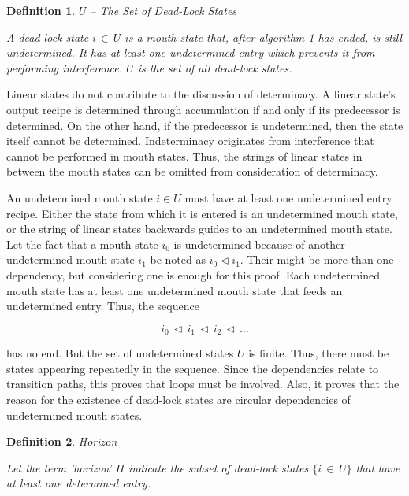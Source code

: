 \documentclass[12pt,a4paper]{scrartcl}
\newtheorem{definition}{Definition}
\begin{document}
\begin{definition} $U$ -- The Set of Dead-Lock States

A dead-lock state $i\,\in\,U$ is a mouth state that, after algorithm 1 has
ended, is still undetermined. It has at least one undetermined entry which
prevents it from performing interference. $U$ is the set of all dead-lock
states.

\end{definition}

Linear states do not contribute to the discussion of determinacy. A linear state's
output recipe is determined through accumulation if and only if its predecessor
is determined. On the other hand, if the predecessor is undetermined, then the 
state itself cannot be determined. Indeterminacy originates from interference 
that cannot be performed in mouth states. Thus, the strings of linear states
in between the mouth states can be omitted from consideration of determinacy.

An undetermined mouth state $i \in U$ must have at least one undetermined entry
recipe. Either the state from which it is entered is an undetermined mouth state, 
or the string of linear states backwards guides to an undetermined mouth state. 
Let the fact that a mouth state $i_0$ is undetermined because of another
undetermined mouth state $i_1$ be noted as $i_0 \vartriangleleft i_1$. Their might
be more than one dependency, but considering one is enough for this proof. Each
undetermined mouth state has at least one undetermined mouth state that feeds
an undetermined entry. Thus, the sequence 

\begin{equation}
    i_0\,\vartriangleleft\,i_1\,\vartriangleleft\,i_2\,\vartriangleleft\,\ldots
\end{equation}

has no end. But the set of undetermined states $U$ is finite. Thus, there must
be states appearing repeatedly in the sequence. Since the dependencies relate to
transition paths, this proves that loops must be involved. Also, it proves that
the reason for the existence of dead-lock states are circular dependencies of
undetermined mouth states.

\begin{definition}
Horizon

Let the term 'horizon' $H$ indicate the subset of dead-lock states $\{
i\,\in\,U \}$ that have at least one determined entry.  
\end{definition}
\end{document}
